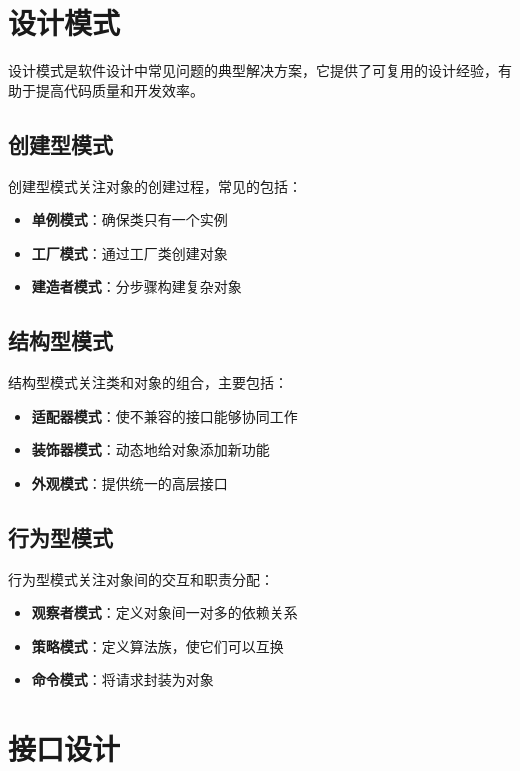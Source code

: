 \section{设计模式}

设计模式是软件设计中常见问题的典型解决方案，它提供了可复用的设计经验，有助于提高代码质量和开发效率。

\subsection{创建型模式}

创建型模式关注对象的创建过程，常见的包括：

\begin{itemize}
    \item \textbf{单例模式}：确保类只有一个实例
    \item \textbf{工厂模式}：通过工厂类创建对象
    \item \textbf{建造者模式}：分步骤构建复杂对象
\end{itemize}

\subsection{结构型模式}

结构型模式关注类和对象的组合，主要包括：

\begin{itemize}
    \item \textbf{适配器模式}：使不兼容的接口能够协同工作
    \item \textbf{装饰器模式}：动态地给对象添加新功能
    \item \textbf{外观模式}：提供统一的高层接口
\end{itemize}

\subsection{行为型模式}

行为型模式关注对象间的交互和职责分配：

\begin{itemize}
    \item \textbf{观察者模式}：定义对象间一对多的依赖关系
    \item \textbf{策略模式}：定义算法族，使它们可以互换
    \item \textbf{命令模式}：将请求封装为对象
\end{itemize}

\section{接口设计}

